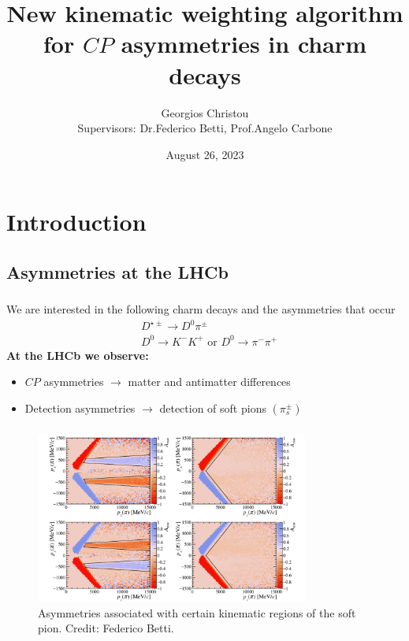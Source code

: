 \documentclass{beamer}
\title[\href{https://summerstudent.web.cern.ch/home}{CERN Summer Student Programme 2023}]
{     
      New kinematic weighting algorithm for $CP$ asymmetries in charm decays
}
\author[\href{https://github.com/GiorgosChr}{Georgios CHristou}]
{Georgios Christou
\\
Supervisors: Dr.\@ Federico Betti, Prof.\@ Angelo Carbone}
\institute[]
{
      LHCb Collaboration
}
\date{August 26, 2023}
\begin{document}
\frame{\titlepage}
\begin{frame}
      \tableofcontents
\end{frame}

\section{Introduction}
\subsection{Asymmetries at the LHCb}


\begin{frame}
      \frametitle{\insertsubsectionhead}
      We are interested in the following charm decays and the asymmetries that occur
      \begin{eqnarray*}
            & D^{\star \pm} \to D^0 \pi^{\pm} \nonumber\\
            &D^0\to K^-K^+ \text{ or } D^0\to \pi^-\pi^+
      \end{eqnarray*}
      \textbf{At the LHCb we observe:}
      \begin{itemize}
            \item $CP$ asymmetries $\rightarrow$ matter and antimatter differences
            \item Detection asymmetries $\rightarrow$ detection of soft pions $(\pi^\pm_s)$
      \end{itemize}
\end{frame}

\begin{frame}
      \frametitle{\insertsubsectionhead}
      \begin{figure}
            \centering
            \includegraphics[width = 0.8\textwidth]{Figures/FedericoPlot.png}
            \caption{Asymmetries associated with certain kinematic regions of the soft pion. Credit: Federico Betti.}
      \end{figure}
\end{frame}
\end{document}
